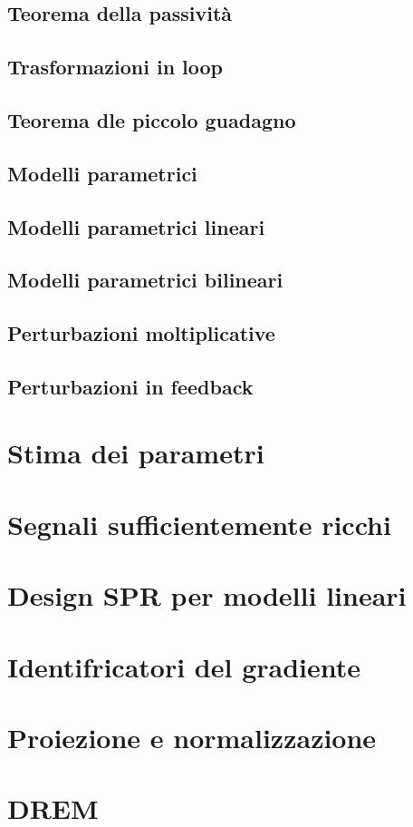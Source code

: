 \documentclass{book}
\begin{document}
\subsection{Teorema della passività}
\subsection{Trasformazioni in loop}
\subsection{Teorema dle piccolo guadagno}
\subsection{Modelli parametrici}
\subsection{Modelli parametrici lineari}
\subsection{Modelli parametrici bilineari}
\subsection{Perturbazioni moltiplicative}
\subsection{Perturbazioni in feedback}
\section{Stima dei parametri}
\section{Segnali sufficientemente ricchi}
\section{Design SPR per modelli lineari}
\section{Identifricatori del gradiente}
\section{Proiezione e normalizzazione}
\section{DREM}
\end{document}
